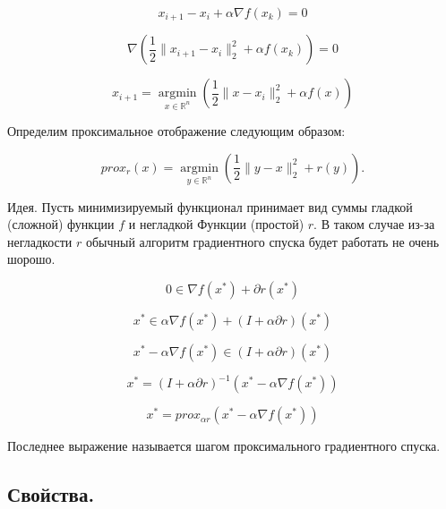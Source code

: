 \begin{equation}
    x_{i+1}-x_i+\alpha\nabla f(x_k)=0
\end{equation}

\begin{equation}
    \nabla\left(\frac12\|x_{i+1}-x_i\|_2^2+\alpha f(x_k)\right)=0
\end{equation}

\begin{equation}
    x_{i+1}=\mathop{argmin}\limits_{x\in\mathbb{R}^n}\left(\frac12\|x-x_i\|_2^2+\alpha f(x)\right)
\end{equation}

Определим проксимальное отображение следующим образом:

\begin{equation}
    prox_r(x)=\mathop{argmin}\limits_{y\in\mathbb{R}^n}\left(\frac12\|y-x\|_2^2+r(y)\right).
\end{equation}

Идея. Пусть минимизируемый функционал принимает вид суммы гладкой (сложной) функции $f$ и негладкой Функции (простой) $r$. В таком случае из-за негладкости $r$ обычный алгоритм градиентного спуска будет работать не очень шорошо.

\begin{equation}
    0\in\nabla f(x^*)+\partial r(x^*)
\end{equation}

\begin{equation}
    x^*\in\alpha\nabla f(x^*)+(I+\alpha\partial r)(x^*)
\end{equation}

\begin{equation}
    x^*-\alpha\nabla f(x^*)\in(I+\alpha\partial r)(x^*)
\end{equation}

\begin{equation}
    x^*=(I+\alpha\partial r)^{-1}(x^*-\alpha\nabla f(x^*))
\end{equation}

\begin{equation}
    x^*=prox_{\alpha r}(x^*-\alpha\nabla f(x^*))
\end{equation}

Последнее выражение называется шагом проксимального градиентного спуска.

\subsection*{Свойства.}

